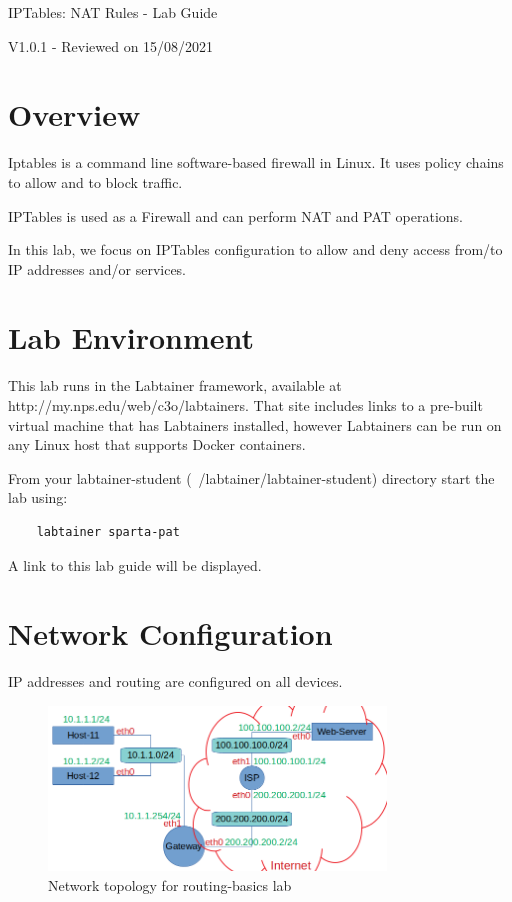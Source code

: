 


\begin{center}
{\LARGE IPTables: NAT Rules - Lab Guide}

V1.0.1 - Reviewed on 15/08/2021
\vspace{0.1in}\\
\end{center}

\copyrightnotice

\section{Overview}
Iptables is a command line software-based firewall in Linux. It uses policy chains to allow and to block traffic.

IPTables is used as a Firewall and can perform NAT and PAT operations.

In this lab, we focus on IPTables configuration to allow and deny access from/to IP addresses and/or services.

\section{Lab Environment}
This lab runs in the Labtainer framework,
available at http://my.nps.edu/web/c3o/labtainers.
That site includes links to a pre-built virtual machine
that has Labtainers installed, however Labtainers can
be run on any Linux host that supports Docker containers.

From your labtainer-student (~/labtainer/labtainer-student) directory start the lab using:
\begin{verbatim}
    labtainer sparta-pat
\end{verbatim}
\noindent A link to this lab guide will be displayed.

\section{Network Configuration}
IP addresses and routing are configured on all devices.

\begin{figure}[H]
\begin{center}
\includegraphics [width=0.8\textwidth]{labtainers-pat-lab-01.png}
\end{center}
\caption{Network topology for routing-basics lab}
\label{fig:topology}
\end{figure}

